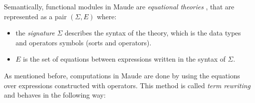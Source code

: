 Semantically, functional modules in Maude are \textit{equational theories} \cite{Lecture1,PeterMaude}, that are represented as a pair $(\Sigma, E)$ where: 
\begin{itemize}
    \item the \textit{signature} $\Sigma$ describes the syntax of the theory, which is the data types and operators symbols (sorts and operators).
    \item $E$ is the set of equations between expressions written in the syntax of $\Sigma$.
\end{itemize}
As mentioned before, computations in Maude are done by using the equations over expressions constructed with operators. This method is called \textit{term rewriting} \cite{Lecture1,PeterMaude} and behaves in the following way: 

